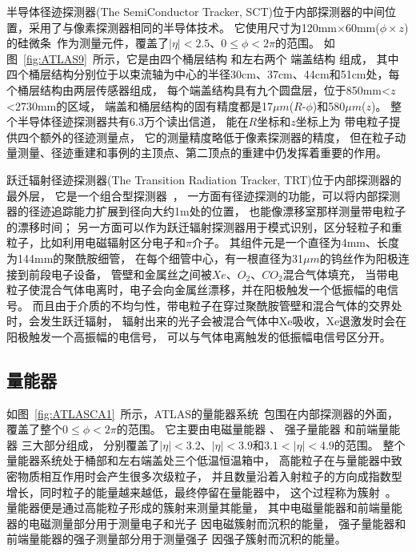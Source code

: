 半导体径迹探测器(The SemiConductor Tracker, SCT)位于内部探测器的中间位置，采用了与像素探测器相同的半导体技术。
它使用尺寸为120mm$\times$60mm($\phi\times z$)的硅微条~\cite{SCTSS}作为测量元件，覆盖了$|\eta|<2.5$、$0\le\phi<2\pi$的范围。
如图~\ref{fig:ATLAS9}~所示，它是由四个桶层结构
和左右两个
端盖结构
组成，
其中四个桶层结构分别位于以束流轴为中心的半径30cm、37cm、44cm和51cm处，每个桶层结构由两层传感器组成，
每个端盖结构具有九个圆盘层，位于850mm<$z$<2730mm的区域，
端盖和桶层结构的固有精度都是17$\mu m$($R$-$\phi$)和580$\mu m$($z$)。
整个半导体径迹探测器共有6.3万个读出信道，
能在$R$坐标和$z$坐标上为
带电粒子提供四个额外的径迹测量点，
它的测量精度略低于像素探测器的精度，
但在粒子动量测量、径迹重建和事例的主顶点、第二顶点的重建中仍发挥着重要的作用。

跃迁辐射径迹探测器(The Transition Radiation Tracker, TRT)位于内部探测器的最外层，
它是一个组合型探测器~\cite{ATLASTRT}，
一方面有径迹探测的功能，可以将内部探测器的径迹追踪能力扩展到径向大约1m处的位置，
也能像漂移室那样测量带电粒子的漂移时间；
另一方面可以作为跃迁辐射探测器用于模式识别，区分轻粒子和重粒子，比如利用电磁辐射区分电子和$\pi$介子。
其组件元是一个直径为4mm、长度为144mm的聚酰胺细管，
在每个细管中心，有一根直径为31$\mu m$的钨丝作为阳极连接到前段电子设备，
管壁和金属丝之间被$Xe$、$O_2$、$CO_2$混合气体填充，
当带电粒子使混合气体电离时，电子会向金属丝漂移，并在阳极触发一个低振幅的电信号。
而且由于介质的不均匀性，带电粒子在穿过聚酰胺管壁和混合气体的交界处时，会发生跃迁辐射，
辐射出来的光子会被混合气体中Xe吸收，Xe退激发时会在阳极触发一个高振幅的电信号，
可以与气体电离触发的低振幅电信号区分开。

\subsection{量能器}
\label{sec:ATLASCA}

如图~\ref{fig:ATLASCA1}~所示，ATLAS的量能器系统~\cite{ATLASLACA,ATLASTCA}包围在内部探测器的外面，
覆盖了整个$0\le\phi<2\pi$的范围。
它主要由电磁量能器
、
强子量能器
和前端量能器
三大部分组成，
分别覆盖了$|\eta|<3.2$、$|\eta|<3.9$和$3.1<|\eta|<4.9$的范围。
整个量能器系统处于桶部和左右端盖处三个低温恒温箱中，
高能粒子在与量能器中致密物质相互作用时会产生很多次级粒子，
并且数量沿着入射粒子的方向成指数型增长，同时粒子的能量越来越低，最终停留在量能器中，
这个过程称为簇射~\cite{CABOOK}。
量能器便是通过高能粒子形成的簇射来测量其能量，
其中电磁量能器和前端量能器的电磁测量部分用于测量电子和光子
因电磁簇射而沉积的能量，
强子量能器和前端量能器的强子测量部分用于测量强子
因强子簇射而沉积的能量。

